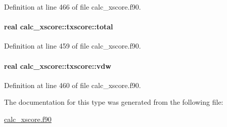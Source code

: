 Definition at line 466 of file calc\-\_\-xscore.\-f90.

\hypertarget{structcalc__xscore_1_1txscore_a0f4f12b1dc6ea5111980b6868c8ae478}{
\paragraph[{total}]{\setlength{\rightskip}{0pt plus 5cm}real calc\-\_\-xscore\-::txscore\-::total}}\label{structcalc__xscore_1_1txscore_a0f4f12b1dc6ea5111980b6868c8ae478}


Definition at line 459 of file calc\-\_\-xscore.\-f90.

\hypertarget{structcalc__xscore_1_1txscore_ab23b87d55742270a8ca8536fea62650c}{
\paragraph[{vdw}]{\setlength{\rightskip}{0pt plus 5cm}real calc\-\_\-xscore\-::txscore\-::vdw}}\label{structcalc__xscore_1_1txscore_ab23b87d55742270a8ca8536fea62650c}


Definition at line 460 of file calc\-\_\-xscore.\-f90.



The documentation for this type was generated from the following file\-:\begin{DoxyCompactItemize}
\item 
\hyperlink{calc__xscore_8f90}{calc\-\_\-xscore.\-f90}\end{DoxyCompactItemize}

